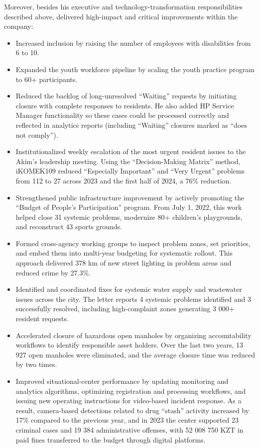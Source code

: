 Moreover, besides his executive and technology-transformation responsibilities described above, \mrl{} delivered high-impact and critical improvements within the company:
\vspace{-0.5\baselineskip}
\begin{itemize}[nosep]
\item Increased inclusion by raising the number of employees with disabilities from 6 to 10.
\item Expanded the youth workforce pipeline by scaling the youth practice program to 60+ participants.
\item Reduced the backlog of long-unresolved ``Waiting'' requests by initiating closure with complete responses to residents. He also added HP Service Manager functionality so these cases could be processed correctly and reflected in analytics reports (including ``Waiting'' closures marked as ``does not comply'').
\item Institutionalized weekly escalation of the most urgent resident issues to the Akim’s leadership meeting. Using the ``Decision-Making Matrix'' method, iKOMEK109 reduced ``Especially Important'' and ``Very Urgent'' problems from 112 to 27 across 2023 and the first half of 2024, a 76\% reduction.
\item Strengthened public infrastructure improvement by actively promoting the ``Budget of People’s Participation'' program. From July 1, 2022, this work helped close 31 systemic problems, modernize 80+ children’s playgrounds, and reconstruct 43 sports grounds.
\item Formed cross-agency working groups to inspect problem zones, set priorities, and embed them into multi-year budgeting for systematic rollout. This approach delivered 378 km of new street lighting in problem areas and reduced crime by 27.3\%.
\item Identified and coordinated fixes for systemic water supply and wastewater issues across the city. The letter reports 4 systemic problems identified and 3 successfully resolved, including high-complaint zones generating 3 000+ resident requests.
\item Accelerated closure of hazardous open manholes by organizing accountability workflows to identify responsible asset holders. Over the last two years, 13 927 open manholes were eliminated, and the average closure time was reduced by two times.
\item Improved situational-center performance by updating monitoring and analytics algorithms, optimizing registration and processing workflows, and issuing new operating instructions for video-based incident response. As a result, camera-based detections related to drug ``stash'' activity increased by 17\% compared to the previous year, and in 2023 the center supported 23 criminal cases and 19 384 administrative offenses, with 52 008 750 KZT in paid fines transferred to the budget through digital platforms.

\end{itemize}
